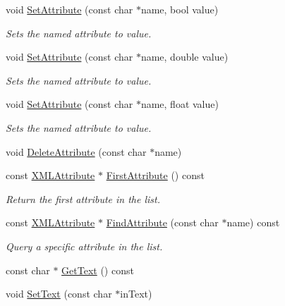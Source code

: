 \begin{DoxyCompactItemize}
void \hyperlink{classtinyxml2_1_1_x_m_l_element_aa848b696e6a75e4e545c6da9893b11e1}{Set\+Attribute} (const char $\ast$name, bool value)
\begin{DoxyCompactList}\small\item\em Sets the named attribute to value. \end{DoxyCompactList}\item 
void \hyperlink{classtinyxml2_1_1_x_m_l_element_a233397ee81e70eb5d4b814c5f8698533}{Set\+Attribute} (const char $\ast$name, double value)
\begin{DoxyCompactList}\small\item\em Sets the named attribute to value. \end{DoxyCompactList}\item 
void \hyperlink{classtinyxml2_1_1_x_m_l_element_a554b70d882e65b28fc084b23df9b9759}{Set\+Attribute} (const char $\ast$name, float value)
\begin{DoxyCompactList}\small\item\em Sets the named attribute to value. \end{DoxyCompactList}\item 
void \hyperlink{classtinyxml2_1_1_x_m_l_element_aebd45aa7118964c30b32fe12e944628a}{Delete\+Attribute} (const char $\ast$name)
\item 
const \hyperlink{classtinyxml2_1_1_x_m_l_attribute}{X\+M\+L\+Attribute} $\ast$ \hyperlink{classtinyxml2_1_1_x_m_l_element_a3e191704c8d499906ec11fe2f60c6686}{First\+Attribute} () const
\begin{DoxyCompactList}\small\item\em Return the first attribute in the list. \end{DoxyCompactList}\item 
const \hyperlink{classtinyxml2_1_1_x_m_l_attribute}{X\+M\+L\+Attribute} $\ast$ \hyperlink{classtinyxml2_1_1_x_m_l_element_a157750dac8037a316fd1af1a973dfa2c}{Find\+Attribute} (const char $\ast$name) const
\begin{DoxyCompactList}\small\item\em Query a specific attribute in the list. \end{DoxyCompactList}\item 
const char $\ast$ \hyperlink{classtinyxml2_1_1_x_m_l_element_a0fa5bea0a4daf3ddd503dcabb823eba6}{Get\+Text} () const
\item 
void \hyperlink{classtinyxml2_1_1_x_m_l_element_a1f9c2cd61b72af5ae708d37b7ad283ce}{Set\+Text} (const char $\ast$in\+Text)
\item 

\end{DoxyCompactItemize}
